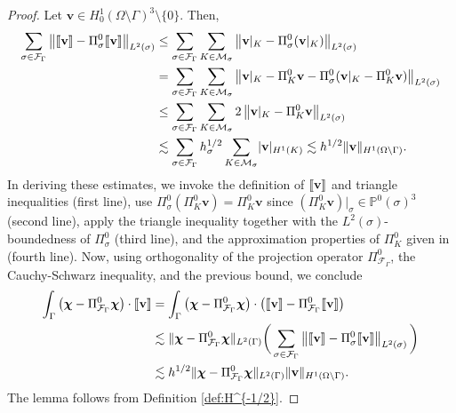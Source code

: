 \documentclass[a4paper,11pt]{article}
\theoremstyle{definition}
\theoremstyle{remark}
\newcommand{\bo}[1]{\mathbf{#1}}
\newcommand{\bos}[1]{\boldsymbol{#1}}
\def\cF{\mathcal{F}}
\def\cM{\mathcal{M}}
\def\sjump#1{[\hskip -1.5pt[#1]\hskip -1.5pt]}
\def\O{\Omega}
\begin{document}
\begin{proof}
Let $\bo{v}\in {H}^1_0(\O\setminus\Gamma)^{3}\setminus\{0\}$. Then,
\begin{align*}
\sum_{\sigma\in\cF_\Gamma}\left\Vert \sjump{\bo{v}}-\Pi^0_{\sigma}\sjump{\bo{v}}\right\Vert_{L^2(\sigma)}
&\le\sum_{\sigma\in\cF_\Gamma}\sum_{K\in\cM_\sigma}\left\Vert\bo{v}|_K-\Pi^0_{\sigma}(\bo{v}|_K)\right\Vert_{L^2(\sigma)}\notag\\
&=\sum_{\sigma\in\cF_\Gamma}\sum_{K\in\cM_\sigma}\left\Vert\bo{v}|_K-\Pi^0_K\bo{v} - \Pi^0_{\sigma}(\bo{v}|_K-\Pi^0_K\bo{v})\right\Vert_{L^2(\sigma)}\notag\\  
&\le \sum_{\sigma\in\cF_\Gamma}\sum_{K\in\cM_\sigma}2\left\Vert\bo{v}|_K-\Pi^0_{K}\bo{v}\right\Vert_{L^2(\sigma)}\notag\\
    &\lesssim \sum_{\sigma\in\cF_\Gamma}h_\sigma^{1/2}\sum_{K\in\cM_\sigma}\lvert \bo{v}\rvert_{H^1(K)}\lesssim h^{1/2} \lVert \bo{v}\rVert_{{H}^1(\O\setminus\Gamma)}.
\end{align*}
In deriving these estimates, we invoke the definition of $\sjump{\bo{v}}$ and triangle inequalities (first line), use $\Pi^0_{\sigma}(\Pi^0_K\bo{v})=\Pi^0_K\bo{v}$ since $(\Pi^0_K\bo{v})|_\sigma\in\mathbb P^0(\sigma)^3$ (second line), apply the triangle inequality together with the $L^2(\sigma)$-boundedness of $\Pi^0_\sigma$ (third line), and the approximation properties of $\Pi^0_K$ given in \cite[Theorem 1.45]{hho-book} (fourth line). Now, using orthogonality of the projection operator $\Pi^0_{\cF_\Gamma}$, the Cauchy-Schwarz inequality, and the previous bound, we conclude
\begin{align*}
\int_\Gamma \big(\bos{\chi}-\Pi^0_{\cF_\Gamma}\bos{\chi}\big)\cdot\sjump{\bo{v}}&=\int_\Gamma \big(\bos{\chi}-\Pi^0_{\cF_\Gamma}\bos{\chi}\big)\cdot\big(\sjump{\bo{v}}-\Pi^0_{\cF_\Gamma}\sjump{\bo{v}}\big)\\
&\lesssim \lVert \bos{\chi}-\Pi^0_{\cF_\Gamma}\bos{\chi}\rVert_{L^2(\Gamma)}\bigg(\sum_{\sigma\in\cF_\Gamma}\left\Vert \sjump{\bo{v}}-\Pi^0_{\sigma}\sjump{\bo{v}}\right\Vert_{L^2(\sigma)}\bigg)\\
&\lesssim h^{1/2}\lVert \bos{\chi}-\Pi^0_{\cF_\Gamma}\bos{\chi}\rVert_{L^2(\Gamma)}\lVert \bo{v}\rVert_{{H}^1(\O\setminus\Gamma)}.
\end{align*}
The lemma follows from Definition \ref{def:H^{-1/2}}.
\end{proof}
\end{document}
